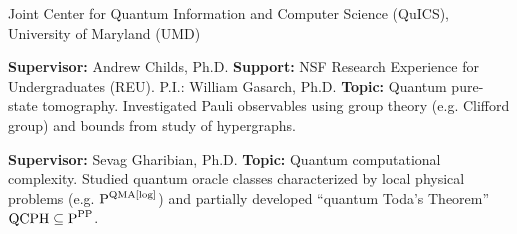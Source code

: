 \documentclass[11pt,letterpaper,serif]{moderncv}
\begin{document}
{
	$\!$\begin{minipage}{0.8\textwidth}
		Joint Center for Quantum Information and Computer Science (QuICS), \newline
		University of Maryland (UMD)	
	\end{minipage}
}
{}{}
{	
	\begin{adjustwidth}{.25in}{}
		\textbf{Supervisor:} Andrew Childs, Ph.D. \newline
		\textbf{Support:} NSF Research Experience for Undergraduates (REU). P.I.: William Gasarch, Ph.D. \newline
		\textbf{Topic:} Quantum pure-state tomography. Investigated Pauli observables using group theory (e.g. Clifford group) and bounds from study of hypergraphs.
	\end{adjustwidth}
}

{
	\begin{adjustwidth}{.25in}{}
		\textbf{Supervisor:} Sevag Gharibian, Ph.D. \newline
		\textbf{Topic:} Quantum computational complexity. Studied quantum oracle classes characterized by local physical problems (e.g. \href{https://complexityzoo.uwaterloo.ca/Complexity_Zoo:P\#pqmalog}{$\textup{P}^{\textup{QMA[log]}}$}) and partially developed ``quantum Toda's Theorem'' $\textup{QCPH}\subseteq \textup{P}^{\textup{PP}}$.
	\end{adjustwidth}
}

\printbibliography[heading=subbibliography, title={Preprints}, keyword=preprint]

\printbibliography[heading=subbibliography, title={Conference Presentations}, keyword=resume_conference]




\end{document}
